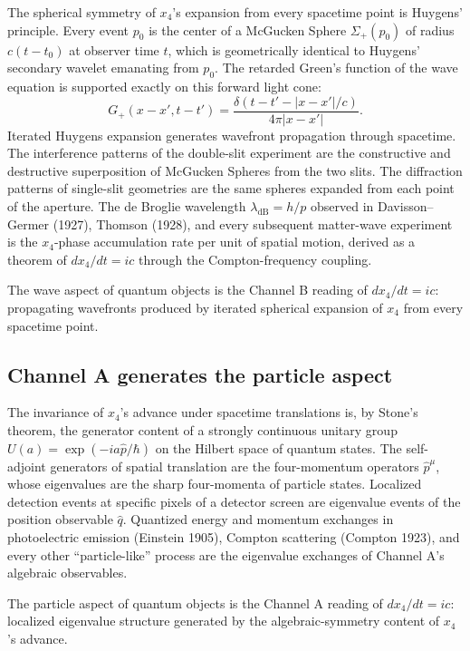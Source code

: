 \documentclass[11pt,a4paper]{article}
\begin{document}
The spherical symmetry of $x_4$'s expansion from every spacetime point is Huygens' principle. Every event $p_0$ is the center of a McGucken Sphere $\Sigma_+(p_0)$ of radius $c(t - t_0)$ at observer time $t$, which is geometrically identical to Huygens' secondary wavelet emanating from $p_0$. The retarded Green's function of the wave equation is supported exactly on this forward light cone:
\begin{equation}
G_+(x - x', t - t') = \frac{\delta(t - t' - |x - x'|/c)}{4\pi |x - x'|}.
\end{equation}
Iterated Huygens expansion generates wavefront propagation through spacetime. The interference patterns of the double-slit experiment are the constructive and destructive superposition of McGucken Spheres from the two slits. The diffraction patterns of single-slit geometries are the same spheres expanded from each point of the aperture. The de Broglie wavelength $\lambda_{\text{dB}} = h/p$ observed in Davisson--Germer (1927), Thomson (1928), and every subsequent matter-wave experiment is the $x_4$-phase accumulation rate per unit of spatial motion, derived as a theorem of $dx_4/dt = ic$ through the Compton-frequency coupling.

The wave aspect of quantum objects is the Channel B reading of $dx_4/dt = ic$: propagating wavefronts produced by iterated spherical expansion of $x_4$ from every spacetime point.

\subsection{Channel A generates the particle aspect}

The invariance of $x_4$'s advance under spacetime translations is, by Stone's theorem, the generator content of a strongly continuous unitary group $U(a) = \exp(-ia\hat{p}/\hbar)$ on the Hilbert space of quantum states. The self-adjoint generators of spatial translation are the four-momentum operators $\hat{p}^\mu$, whose eigenvalues are the sharp four-momenta of particle states. Localized detection events at specific pixels of a detector screen are eigenvalue events of the position observable $\hat{q}$. Quantized energy and momentum exchanges in photoelectric emission (Einstein 1905), Compton scattering (Compton 1923), and every other ``particle-like'' process are the eigenvalue exchanges of Channel A's algebraic observables.

The particle aspect of quantum objects is the Channel A reading of $dx_4/dt = ic$: localized eigenvalue structure generated by the algebraic-symmetry content of $x_4$'s advance.
\end{document}
